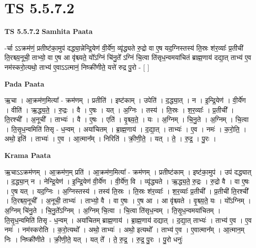 \documentclass[17pt]{extarticle}
\begin{document}
\section{ TS 5.5.7.2 }

\textbf{TS 5.5.7.2 } \newline
\textbf{Samhita Paata} \newline

-र्चा ऽऽक्रम॑णं॒ प्रतीष्ट॑का॒मुप॑ दद्ध्या॒न्नेन्द्रि॒येण॑ वी॒र्ये॑ण॒ व्यृ॑द्ध्यते रु॒द्रो वा ए॒ष यद॒ग्निस्तस्य॑ ति॒स्रः श॑र॒व्याः᳚ प्र॒तीची॑ ति॒रश्च्य॒नूची॒ ताभ्यो॒ वा ए॒ष आ वृ॑श्च्यते॒ यो᳚ऽग्निं चि॑नु॒ते᳚ ऽग्निं चि॒त्वा ति॑सृध॒न्वमया॑चितं ब्राह्म॒णाय॑ दद्या॒त् ताभ्य॑ ए॒व नम॑स्करो॒त्यथो॒ ताभ्य॑ ए॒वाऽऽत्मानं॒ निष्क्री॑णीते॒ यत्ते॑ रुद्र पु॒रो - [  ] \newline

\textbf{Pada Paata} \newline

ऋ॒चा । आ॒क्रम॑ण॒मित्या᳚ - क्रम॑णम् । प्रतीति॑ । इष्ट॑काम् । उपेति॑ । द॒द्ध्या॒त् । न । इ॒न्द्रि॒येण॑ । वी॒र्ये॑ण । वीति॑ । ऋ॒द्ध्य॒ते॒ । रु॒द्रः । वै । ए॒षः । यत् । अ॒ग्निः । तस्य॑ । ति॒स्रः । श॒र॒व्याः᳚ । प्र॒तीची᳚ । ति॒रश्ची᳚ । अ॒नूची᳚ । ताभ्यः॑ । वै । ए॒षः । एति॑ । वृ॒श्च्य॒ते॒ । यः । अ॒ग्निम् । चि॒नु॒ते । अ॒ग्निम् । चि॒त्वा । ति॒सृ॒ध॒न्वमिति॑ तिसृ - ध॒न्वम् । अया॑चितम् । ब्रा॒ह्म॒णाय॑ । द॒द्या॒त् । ताभ्यः॑ । ए॒व । नमः॑ । क॒रो॒ति॒ । अथो॒ इति॑ । ताभ्यः॑ । ए॒व । आ॒त्मान᳚म् । निरिति॑ । क्री॒णी॒ते॒ । यत् । ते॒ । रु॒द्र॒ । पु॒रः ।  \newline


\textbf{Krama Paata} \newline

ऋ॒चाऽऽक्रम॑णम् । आ॒क्रम॑ण॒म् प्रति॑ । आ॒क्रम॑ण॒मित्या᳚ - क्रम॑णम् । प्रतीष्ट॑काम् । इष्ट॑का॒मुप॑ । उप॑ दद्ध्यात् । द॒द्ध्या॒न् न । नेन्द्रि॒येण॑ । इ॒न्द्रि॒येण॑ वी॒र्ये॑ण । वी॒र्ये॑ण॒ वि । व्यृ॑द्ध्यते । ऋ॒द्ध्य॒ते॒ रु॒द्रः । रु॒द्रो वै । वा ए॒षः । ए॒ष यत् । यद॒ग्निः । अ॒ग्निस्तस्य॑ । तस्य॑ ति॒स्रः । ति॒स्रः श॑र॒व्याः᳚ । श॒र॒व्याः᳚ प्र॒तीची᳚ । प्र॒तीची॑ ति॒रश्ची᳚ । ति॒रश्च्य॒नूची᳚ । अ॒नूची॒ ताभ्यः॑ । ताभ्यो॒ वै । वा ए॒षः । ए॒ष आ । आ वृ॑श्च्यते । वृ॒श्च्य॒ते॒ यः । यो᳚ऽग्निम् । अ॒ग्निम् चि॑नु॒ते । चि॒नु॒ते᳚ऽग्निम् । अ॒ग्निम् चि॒त्वा । चि॒त्वा ति॑सृध॒न्वम् । ति॒सृ॒ध॒न्वमया॑चितम् । ति॒सृ॒ध॒न्वमिति॑ तिसृ - ध॒न्वम् । अया॑चितम् ब्राह्म॒णाय॑ । ब्रा॒ह्म॒णाय॑ दद्यात् । द॒द्या॒त् ताभ्यः॑ । ताभ्य॑ ए॒व । ए॒व नमः॑ । नम॑स्करोति । क॒रो॒त्यथो᳚ । अथो॒ ताभ्यः॑ । अथो॒ इत्यथो᳚ । ताभ्य॑ ए॒व । ए॒वात्मान᳚म् । आ॒त्मान॒म् निः । निष्क्री॑णीते । क्री॒णी॒ते॒ यत् । यत् ते᳚ । ते॒ रु॒द्र॒ । रु॒द्र॒ पु॒रः । पु॒रो धनुः॑ \newline
\end{document}

